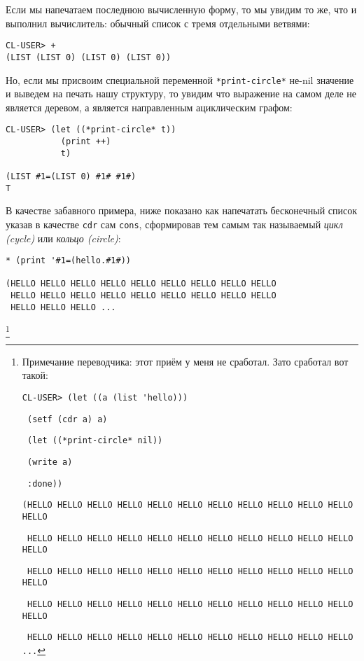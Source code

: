 Если мы напечатаем последнюю вычисленную форму, то мы увидим то же, что и выполнил вычислитель: обычный список с тремя отдельными ветвями:

\begin{verbatim}
CL-USER> +
(LIST (LIST 0) (LIST 0) (LIST 0))
\end{verbatim}

Но, если мы присвоим специальной переменной \verb"*print-circle*" не-nil значение и выведем на печать нашу структуру, то увидим что выражение на самом деле не является деревом, а является направленным ациклическим графом:

\begin{verbatim}
CL-USER> (let ((*print-circle* t))
           (print ++)
           t)

(LIST #1=(LIST 0) #1# #1#) 
T
\end{verbatim}

В качестве забавного примера, ниже показано как напечатать бесконечный список указав в качестве \verb"cdr" сам \verb"cons", сформировав тем самым так называемый \emph{цикл (cycle)} или \emph{кольцо (circle)}:

\begin{verbatim}
* (print '#1=(hello.#1#))

(HELLO HELLO HELLO HELLO HELLO HELLO HELLO HELLO HELLO 
 HELLO HELLO HELLO HELLO HELLO HELLO HELLO HELLO HELLO 
 HELLO HELLO HELLO ...
\end{verbatim}
\footnote{Примечание переводчика: этот приём у меня не сработал. Зато сработал вот такой:

\texttt{\verb"CL-USER> (let ((a (list 'hello)))"}

\texttt{\qquad\qquad\quad\verb" (setf (cdr a) a)"}

\texttt{\qquad\qquad\quad\verb" (let ((*print-circle* nil))"}

\texttt{\qquad\qquad\qquad\verb" (write a)"}

\texttt{\qquad\qquad\qquad\verb" :done))"}

\verb"(HELLO HELLO HELLO HELLO HELLO HELLO HELLO HELLO HELLO HELLO HELLO HELLO"

\verb" HELLO HELLO HELLO HELLO HELLO HELLO HELLO HELLO HELLO HELLO HELLO HELLO"

\verb" HELLO HELLO HELLO HELLO HELLO HELLO HELLO HELLO HELLO HELLO HELLO HELLO"

\verb" HELLO HELLO HELLO HELLO HELLO HELLO HELLO HELLO HELLO HELLO HELLO HELLO"

\verb" HELLO HELLO HELLO HELLO HELLO HELLO HELLO HELLO HELLO HELLO HELLO ..."
}

